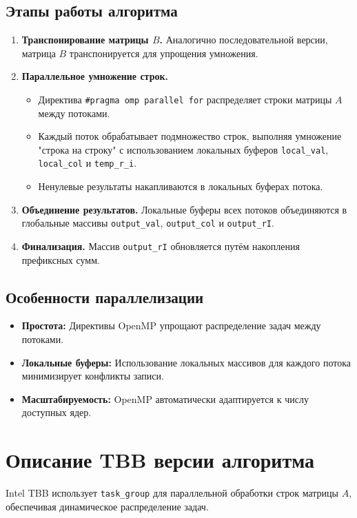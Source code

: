 \documentclass[a4paper,12pt]{article}
\begin{document}
\subsection{Этапы работы алгоритма}
\begin{enumerate}
    \item \textbf{Транспонирование матрицы \( B \).} Аналогично последовательной версии, матрица \( B \) транспонируется для упрощения умножения.
    \item \textbf{Параллельное умножение строк.} 
    \begin{itemize}
        \item Директива \texttt{\#pragma omp parallel for} распределяет строки матрицы \( A \) между потоками.
        \item Каждый поток обрабатывает подмножество строк, выполняя умножение "строка на строку" с использованием локальных буферов \texttt{local\_val}, \texttt{local\_col} и \texttt{temp\_r\_i}.
        \item Ненулевые результаты накапливаются в локальных буферах потока.
    \end{itemize}
    \item \textbf{Объединение результатов.} Локальные буферы всех потоков объединяются в глобальные массивы \texttt{output\_val}, \texttt{output\_col} и \texttt{output\_rI}.
    \item \textbf{Финализация.} Массив \texttt{output\_rI} обновляется путём накопления префиксных сумм.
\end{enumerate}

\subsection{Особенности параллелизации}
\begin{itemize}
    \item \textbf{Простота:} Директивы OpenMP упрощают распределение задач между потоками.
    \item \textbf{Локальные буферы:} Использование локальных массивов для каждого потока минимизирует конфликты записи.
    \item \textbf{Масштабируемость:} OpenMP автоматически адаптируется к числу доступных ядер.
\end{itemize}

\section{Описание TBB версии алгоритма}
Intel TBB использует \texttt{task\_group} для параллельной обработки строк матрицы \( A \), обеспечивая динамическое распределение задач.
\end{document}
